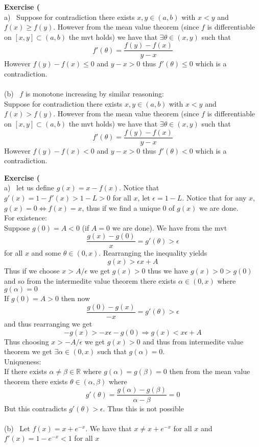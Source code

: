 \documentclass[12pt]{article}
\newenvironment{ques}[1]{\textbf{Exercise #1}\vspace{1 mm}\\ }{\bigskip}
\theoremstyle{definition}
\newcommand{\R}{\mathbb R}
\renewcommand{\t}{\theta}
\renewcommand{\a}{\alpha}
\begin{document}
\begin{ques}{3}
	(a) \ Suppose for contradiction there exists $x,y \in (a,b)$ with $x < y$ and
	$f(x) \ge f(y)$. However from the mean value theorem (since $f$ is
	differentiable on $[x,y] \subset (a,b)$ the mvt holds) we have that
	$\exists \t \in (x,y)$ such that 
	$$f'(\t) = \frac{f(y) - f(x)}{y-x}$$
	However $f(y) - f(x) \le 0$ and $y-x > 0$ thus $f'(\t) \le 0$ which is a
	contradiction.\\
	\\
	(b) \ $f$ is monotone increasing by similar reasoning:\\
	Suppose for contradiction there exists $x,y \in (a,b)$ with $x < y$ and
	$f(x) > f(y)$. However from the mean value theorem (since $f$ is
	differentiable on $[x,y] \subset (a,b)$ the mvt holds) we have that
	$\exists \t \in (x,y)$ such that 
	$$f'(\t) = \frac{f(y) - f(x)}{y-x}$$
	However $f(y) - f(x) < 0$ and $y-x > 0$ thus $f'(\t) < 0$ which is a
	contradiction.\\
\end{ques}

\begin{ques}{9}
	(a) \ let us define $g(x) = x - f(x)$. Notice that $g'(x) = 1 - f'(x) > 1 -
	L > 0$ for all $x$, let $\epsilon = 1- L$. Notice that for any $x$, $g(x) =
	0  \Leftrightarrow f(x) = x$, thus if we find a unique $0$ of $g(x)$ we are
	done.\\
	For existence:\\
	Suppose $g(0) = A < 0$ (if $A = 0$ we are done). We have from the mvt
	$$\frac{g(x) - g(0)}{x} = g'(\t) > \epsilon$$
	for all $x$ and some $\t \in (0,x)$. Rearranging the inequality yields
	$$g(x) > \epsilon x + A$$
	Thus if we choose $x > A/\epsilon$ we get $g(x) > 0$ thus we have $g(x) > 0
	> g(0)$ and so from the intermedite value theorem there exists $\a \in
	(0,x)$ where $g(\a) = 0$\\
	If $g(0) = A > 0$ then now
	$$\frac{g(0) - g(x)}{-x} = g'(\t) > \epsilon$$
	and thus rearranging we get
	$$-g(x) > -x\epsilon - g(0) \Rightarrow g(x) < x\epsilon + A$$
	Thus choosing $x > -A/\epsilon$ we get $g(x) > 0$ and thus from intermedite
	value theorem we get $\exists \alpha \in (0,x)$ such that $g(\a) = 0$.\\
	Uniqueness:\\
	If there exists $\alpha \neq \beta \in \R$ where $g(\alpha) = g(\beta) = 0$
	then from the mean value theorem there exists $\t \in (\alpha, \beta)$ where
	$$g'(\t) = \frac{g(\a) - g(\beta)}{\a - \beta} = 0$$
	But this contradicts $g'(\t) > \epsilon$. Thus this is not possible
\\
	\\
	(b) \ Let $f(x) = x + e^{-x}$. We have that $x \neq x + e^{-x}$ for all $x$
	and $f'(x) = 1 - e^{-x} < 1$ for all $x$ 
\end{ques}
\end{document}
